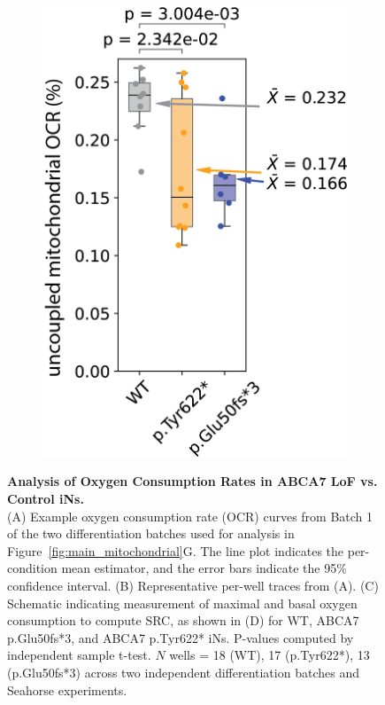 \begin{figure}[ht]
\begin{subfigure}[t]{0.25\textwidth}
        \includegraphics[width=\textwidth]{./extended_plots/uncoupling_quantification_batch2.png}        
    \end{subfigure} 
    \caption{
         \textbf{Analysis of Oxygen Consumption Rates in ABCA7 LoF vs. Control iNs.}\\[1ex]
         (A) Example oxygen consumption rate (OCR) curves from Batch 1 of the two differentiation batches used for analysis in Figure~\ref{fig:main_mitochondrial}G. The line plot indicates the per-condition mean estimator, and the error bars indicate the 95\% confidence interval. 
         (B) Representative per-well traces from (A). 
         (C) Schematic indicating measurement of maximal and basal oxygen consumption to compute SRC, as shown in 
         (D) for WT, ABCA7 p.Glu50fs*3, and ABCA7 p.Tyr622* iNs. P-values computed by independent sample t-test. $N$ wells = 18 (WT), 17 (p.Tyr622*), 13 (p.Glu50fs*3) across two independent differentiation batches and Seahorse experiments. 
}
\end{figure}
